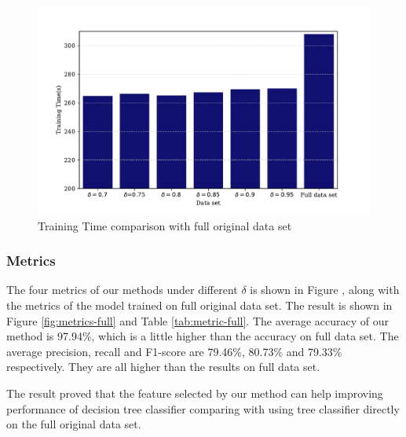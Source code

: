 \documentclass{ieeeaccess}
\theoremstyle{definition}
\begin{document}
\begin{figure}[!htpb]
    \centering
    \includegraphics[scale=0.4]{fig/training-time-all.pdf}
    \caption{Training Time comparison with full original data set}
    \label{fig:training-time-with-full}
\end{figure}

\subsubsection{Metrics}

The four metrics of our methods under different $\delta$ is shown in Figure , along with the metrics of the model trained on full original data set. The result is shown in Figure \ref{fig:metrics-full} and Table \ref{tab:metric-full}. The average accuracy of our method is 97.94\%, which is a little higher than the accuracy on full data set. The average precision, recall and F1-score are 79.46\%, 80.73\% and 79.33\% respectively. They are all higher than the results on full data set. 

The result proved that the feature selected by our method can help improving performance of decision tree classifier comparing with using tree classifier directly on the full original data set.
\end{document}

